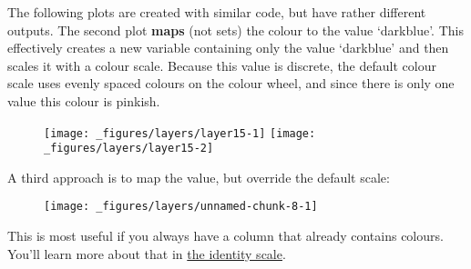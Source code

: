 The following plots are created with similar code, but have rather
different outputs. The second plot \textbf{maps} (not sets) the colour
to the value `darkblue'. This effectively creates a new variable
containing only the value `darkblue' and then scales it with a colour
scale. Because this value is discrete, the default colour scale uses
evenly spaced colours on the colour wheel, and since there is only one
value this colour is pinkish.

\begin{Shaded}
\begin{Highlighting}[]
\OperatorTok{+}\StringTok{ }
\StringTok{  }\NormalTok{(} \NormalTok{) }

\OperatorTok{+}\StringTok{ }
\StringTok{  }\NormalTok{(}\NormalTok{(} \NormalTok{))}
\end{Highlighting}
\end{Shaded}

\begin{figure}[H]
  \texttt{[image: \_figures/layers/layer15-1]}%
  \texttt{[image: \_figures/layers/layer15-2]}
\end{figure}

A third approach is to map the value, but override the default scale:

\begin{Shaded}
\begin{Highlighting}[]
\OperatorTok{+}\StringTok{ }
\StringTok{  }\NormalTok{(}\NormalTok{(} \NormalTok{)) }\OperatorTok{+}\StringTok{ }
\StringTok{  }\NormalTok{()}
\end{Highlighting}
\end{Shaded}

\begin{figure}[H]
  \centering
  \texttt{[image: \_figures/layers/unnamed-chunk-8-1]}
\end{figure}

This is most useful if you always have a column that already contains
colours. You'll learn more about that in
\protect\hyperlink{sub:scale-identity}{the identity scale}.

